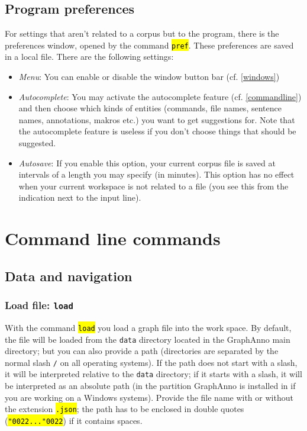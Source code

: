 \documentclass[12pt]{scrartcl}
\newcommand{\quo}{\char"0022}
\newcommand{\code}[1]{\hl{\texttt{#1}}}
\begin{document}
\subsection{Program preferences}\label{preferences}

For settings that aren’t related to a corpus but to the program, there is the preferences window, opened by the command \code{pref}.
These preferences are saved in a local file.
There are the following settings:

\begin{itemize}
	\item \textit{Menu}: You can enable or disable the window button bar (cf. \ref{windows}) 
	\item \textit{Autocomplete}: You may activate the autocomplete feature (cf. \ref{commandline}) and then choose which kinds of entities (commands, file names, sentence names, annotations, makros etc.) you want to get suggestions for. Note that the autocomplete feature is useless if you don’t choose things that should be suggested.
	\item \textit{Autosave}: If you enable this option, your current corpus file is saved at intervals of a length you may specify (in minutes). This option has no effect when your current workspace is not related to a file (you see this from the indication next to the input line).
\end{itemize}



\section{Command line commands}\label{commandline-commands}

\subsection{Data and navigation}\label{data-and-navigation}

\subsubsection{Load file: \texttt{load}}

With the command \code{load} you load a graph file into the work space.
By default, the file will be loaded from the \texttt{data} directory located in the GraphAnno main directory; but you can also provide a path (directories are separated by the normal slash \texttt{/} on all operating systems).
If the path does not start with a slash, it will be interpreted relative to the \texttt{data} directory; if it starts with a slash, it will be interpreted as an absolute path (in the partition GraphAnno is installed in if you are working on a Windows systems).
Provide the file name with or without the extension \code{.json}; the path has to be enclosed in double quotes (\code{\quo...\quo}) if it contains spaces.
\end{document}

